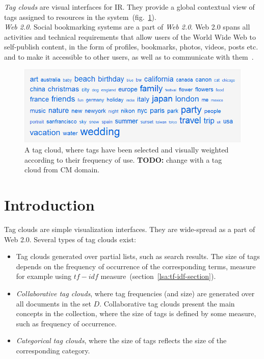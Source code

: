 \textit{Tag clouds} are visual interfaces for \gls{IR}. They provide a global contextual view of tags assigned to resources in the system~(fig.~\ref{fig:tagcloud}). \\

\textit{Web 2.0}. Social bookmarking systems are a part of \textit{Web 2.0}. Web 2.0 spans all activities and technical requirements that allow users of the World Wide Web to self-publish content, in the form of profiles, bookmarks, photos, videos, posts etc. and to make it accessible to other users, as well as to communicate with them~\cite{folksonomiesWeb2.0_2009}. \\


%
%
\begin{figure}[htbp]
	\centering
	\includegraphics[width=\ScaleIfNeeded]{img/tagcloud} 
	\caption[A tag cloud.]{A tag cloud, where tags have been selected and visually weighted according to their frequency of use. \textbf{TODO:} change with a tag cloud from CM domain. }
	\label{fig:tagcloud}
\end{figure}

\section{Introduction}
Tag clouds are simple visualization interfaces. They are wide-spread as a part of Web 2.0. Several types of tag clouds exist: \\
\begin{itemize}
\item Tag clouds generated over partial lists, such as search results. The size of tags depends on the frequency of occurrence of the corresponding terms, measure for example using $tf-idf$  measure~(section~\ref{lsa:tf-idf-section}).

\item \textit{Collaborative tag clouds}, where tag frequencies (and size) are generated over all documents in the set $D$. Collaborative tag clouds present the main concepts in the collection, where the size of tags is defined by some measure, such as frequency of occurrence. 

\item \textit{ Categorical tag clouds}, where the size of tags reflects the size of the corresponding category. \\
\end{itemize}

